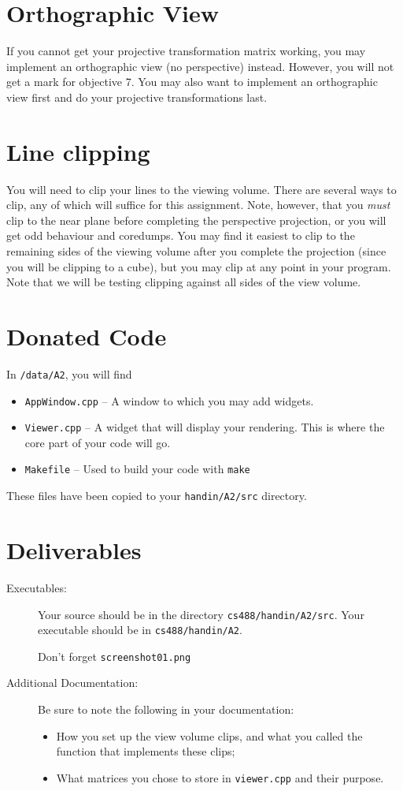 \section{Orthographic View}
If you cannot get your projective transformation matrix working,
you may implement an orthographic view (no perspective) instead.
However, you will not get a mark for objective 7.  You may also 
want to implement an orthographic view first and do your projective
transformations last.

\section{Line clipping}
You will need to clip your lines to the viewing volume.  There are
several ways to clip, any of which will suffice for this assignment.
Note, however, that you \emph{must} clip to the near plane before completing
the perspective projection, or you will get odd behaviour and coredumps.
You may find it easiest to clip to the remaining sides of the viewing
volume after you complete the projection (since you will be clipping to
a cube), but you may clip at any point in your program.
Note that we will be testing clipping against all sides of the view
volume.

\section{Donated Code}
In {\tt \CourseData/data/A2}, you will find
\begin{itemize}
        \item {\tt AppWindow.cpp} -- A window to which you may add
          widgets.
        \item {\tt Viewer.cpp} -- A widget that will display your
          rendering. This is where the core part of your code will go.
        \item {\tt Makefile} -- Used to build your code with \texttt{make} 
\end{itemize}
These files have been copied to your \texttt{handin/A2/src} directory.

\section{Deliverables}
\begin{description}
\item[Executables:] \hfill

  Your source should be in the directory {\tt cs488/handin/A2/src}.
  Your executable should be in {\tt cs488/handin/A2}.

  Don't forget \texttt{screenshot01.png}

\item[Additional Documentation:]
Be sure to note the following in your documentation: \hfill
\begin{itemize}
        \item How you set up the view volume clips, and what you called the
                function that implements these clips;
	\item What matrices you chose to store in {\tt viewer.cpp} and 
		their purpose.
\end{itemize}
\end{description}

